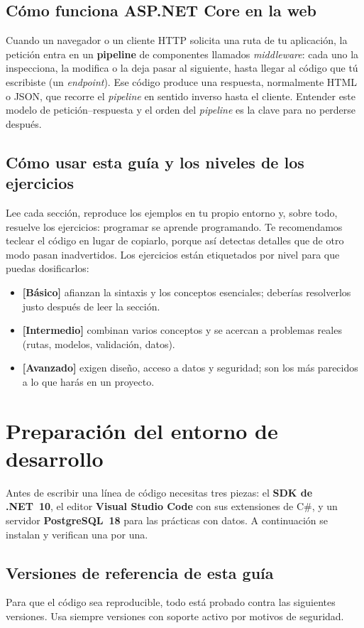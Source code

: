 \documentclass[11pt]{article}
\begin{document}
\subsection{Cómo funciona ASP.NET Core en la web}
Cuando un navegador o un cliente HTTP solicita una ruta de tu aplicación, la petición entra en un \textbf{pipeline} de componentes llamados \emph{middleware}: cada uno la inspecciona, la modifica o la deja pasar al siguiente, hasta llegar al código que tú escribiste (un \emph{endpoint}). Ese código produce una respuesta, normalmente HTML o JSON, que recorre el \emph{pipeline} en sentido inverso hasta el cliente. Entender este modelo de petición--respuesta y el orden del \emph{pipeline} es la clave para no perderse después.

\subsection{Cómo usar esta guía y los niveles de los ejercicios}
Lee cada sección, reproduce los ejemplos en tu propio entorno y, sobre todo, resuelve los ejercicios: programar se aprende programando. Te recomendamos teclear el código en lugar de copiarlo, porque así detectas detalles que de otro modo pasan inadvertidos. Los ejercicios están etiquetados por nivel para que puedas dosificarlos:

\begin{itemize}[leftmargin=1.4em,itemsep=2pt,topsep=2pt]
\item \textbf{[Básico]} afianzan la sintaxis y los conceptos esenciales; deberías resolverlos justo después de leer la sección.
\item \textbf{[Intermedio]} combinan varios conceptos y se acercan a problemas reales (rutas, modelos, validación, datos).
\item \textbf{[Avanzado]} exigen diseño, acceso a datos y seguridad; son los más parecidos a lo que harás en un proyecto.
\end{itemize}

\section{Preparación del entorno de desarrollo}
Antes de escribir una línea de código necesitas tres piezas: el \textbf{SDK de .NET~10}, el editor \textbf{Visual Studio Code} con sus extensiones de C\#, y un servidor \textbf{PostgreSQL~18} para las prácticas con datos. A continuación se instalan y verifican una por una.

\subsection{Versiones de referencia de esta guía}
Para que el código sea reproducible, todo está probado contra las siguientes versiones. Usa siempre versiones con soporte activo por motivos de seguridad.
\end{document}
